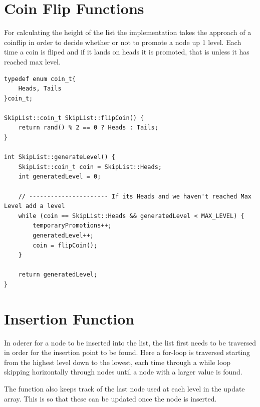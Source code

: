 \documentclass[12pt, a4paper]{report}
\begin{document}
\section{Coin Flip Functions}
For calculating the height of the list the implementation takes the approach of a coinflip in order to decide whether or not to promote a node up 1 level. Each time a coin is fliped and if it lands on heads it is promoted, that is unless it has reached max level.
\begin{verbatim}
typedef enum coin_t{
    Heads, Tails
}coin_t;

SkipList::coin_t SkipList::flipCoin() {
    return rand() % 2 == 0 ? Heads : Tails;
}

int SkipList::generateLevel() {
    SkipList::coin_t coin = SkipList::Heads;
    int generatedLevel = 0;

    // ---------------------- If its Heads and we haven't reached Max Level add a level
    while (coin == SkipList::Heads && generatedLevel < MAX_LEVEL) {
        temporaryPromotions++;
        generatedLevel++;
        coin = flipCoin();
    }

    return generatedLevel;
}
\end{verbatim}
\section{Insertion Function}
In oderer for a node to be inserted into the list, the list first needs to be traversed in order for the insertion point to be found. Here a for-loop is traversed starting from the highest level down to the lowest, each time through a while loop skipping horizontally through nodes until a node with a larger value is found.

The function also keeps track of the last node used at each level in the update array. This is so that these can be updated once the node is inserted. 
\end{document}
